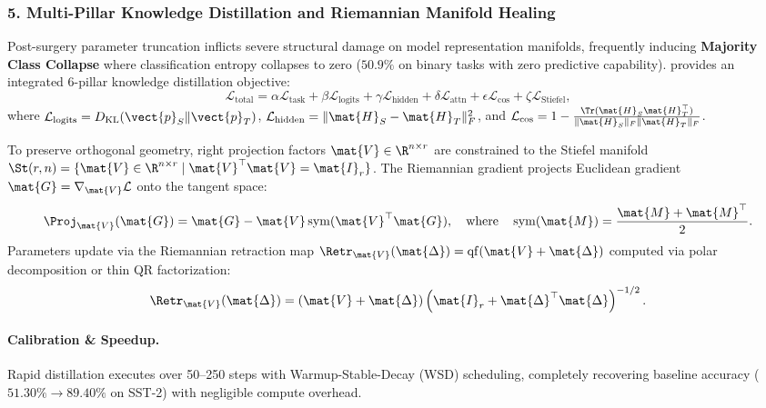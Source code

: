 \subsubsection{5. Multi-Pillar Knowledge Distillation and Riemannian Manifold Healing}
\label{subsubsec:distillation_healing}
Post-surgery parameter truncation inflicts severe structural damage on model representation manifolds, frequently inducing \textbf{Majority Class Collapse} where classification entropy collapses to zero ($50.9\%$ on binary tasks with zero predictive capability). \neuralops{} provides an integrated 6-pillar knowledge distillation objective:
\begin{equation}
\mathcal{L}_{\text{total}} = \alpha \mathcal{L}_{\text{task}} + \beta \mathcal{L}_{\text{logits}} + \gamma \mathcal{L}_{\text{hidden}} + \delta \mathcal{L}_{\text{attn}} + \epsilon \mathcal{L}_{\text{cos}} + \zeta \mathcal{L}_{\text{Stiefel}},
\label{eq:six_pillar_objective}
\end{equation}
where $\mathcal{L}_{\text{logits}} = D_{\text{KL}}(\vect{p}_S \| \vect{p}_T)$, $\mathcal{L}_{\text{hidden}} = \|\mat{H}_S - \mat{H}_T\|_F^2$, and $\mathcal{L}_{\text{cos}} = 1 - \frac{\Tr(\mat{H}_S \mat{H}_T^\top)}{\|\mat{H}_S\|_F \|\mat{H}_T\|_F}$. 

To preserve orthogonal geometry, right projection factors $\mat{V} \in \R^{n \times r}$ are constrained to the Stiefel manifold $\St(r, n) = \{ \mat{V} \in \R^{n \times r} \mid \mat{V}^\top \mat{V} = \mat{I}_r \}$. The Riemannian gradient projects Euclidean gradient $\mat{G} = \nabla_{\mat{V}} \mathcal{L}$ onto the tangent space:
\begin{equation}
\Proj_{\mat{V}}(\mat{G}) = \mat{G} - \mat{V} \operatorname{sym}(\mat{V}^\top \mat{G}), \quad \text{where} \quad \operatorname{sym}(\mat{M}) = \frac{\mat{M} + \mat{M}^\top}{2}.
\end{equation}
Parameters update via the Riemannian retraction map $\Retr_{\mat{V}}(\mat{\Delta}) = \operatorname{qf}(\mat{V} + \mat{\Delta})$ computed via polar decomposition or thin QR factorization:
\begin{equation}
\Retr_{\mat{V}}(\mat{\Delta}) = (\mat{V} + \mat{\Delta})\left( \mat{I}_r + \mat{\Delta}^\top \mat{\Delta} \right)^{-1/2}.
\end{equation}

\paragraph{Calibration \& Speedup.} Rapid distillation executes over 50--250 steps with Warmup-Stable-Decay (WSD) scheduling, completely recovering baseline accuracy ($51.30\% \to 89.40\%$ on SST-2) with negligible compute overhead.

